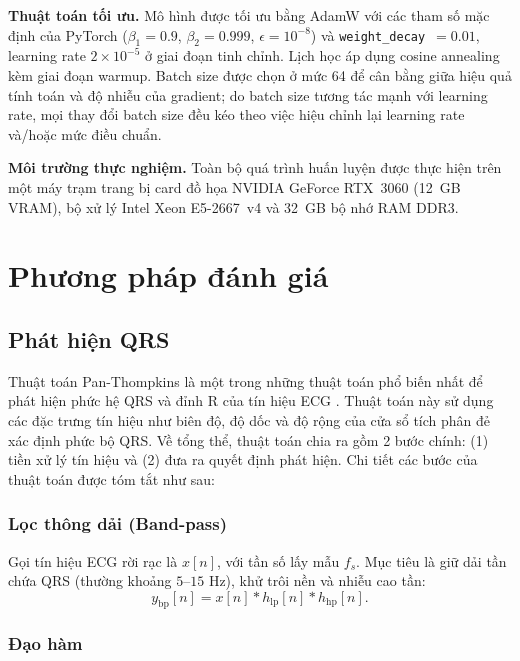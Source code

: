 \documentclass[../DoAn.tex]{subfiles}
\begin{document}
\textbf{Thuật toán tối ưu.}
Mô hình được tối ưu bằng AdamW với các tham số mặc định của PyTorch ($\beta_1=0.9$,
$\beta_2=0.999$, $\epsilon=10^{-8}$) và \texttt{weight\_decay}~$=0.01$, learning rate
$2\times10^{-5}$ ở giai đoạn tinh chỉnh. Lịch học áp dụng cosine annealing kèm giai đoạn
warmup. Batch size được chọn ở mức 64 để cân bằng giữa hiệu quả tính toán và độ nhiễu của
gradient; do batch size tương tác mạnh với learning rate, mọi thay đổi batch size đều kéo theo
việc hiệu chỉnh lại learning rate và/hoặc mức điều chuẩn.

\textbf{Môi trường thực nghiệm.}
Toàn bộ quá trình huấn luyện được thực hiện trên một máy trạm trang bị card đồ họa NVIDIA GeForce RTX~3060 (12~GB VRAM), bộ xử lý Intel Xeon E5-2667~v4 và 32~GB bộ nhớ RAM DDR3.

\section{Phương pháp đánh giá}
\label{sec:evaluation}

\subsection{Phát hiện QRS}

Thuật toán Pan-Thompkins là một trong những thuật toán phổ biến nhất để phát hiện phức hệ QRS và đỉnh R của tín hiệu ECG \cite{panRealTimeQRSDetection1985a}. Thuật toán này sử dụng các đặc trưng tín hiệu như biên độ, độ dốc và độ rộng của cửa sổ tích phân đẻ xác định phức bộ QRS. Về tổng thể, thuật toán chia ra gồm 2 bước chính: (1) tiền xử lý tín hiệu và (2) đưa ra quyết định phát hiện. Chi tiết các bước của thuật toán được tóm tắt như sau:

\subsubsection{Lọc thông dải (Band-pass)}

Gọi tín hiệu ECG rời rạc là $x[n]$, với tần số lấy mẫu $f_s$.
Mục tiêu là giữ dải tần chứa QRS (thường khoảng $5$--$15$ Hz), khử trôi nền và nhiễu cao tần:
\begin{equation}
  y_{\mathrm{bp}}[n] = x[n] * h_{\mathrm{lp}}[n] * h_{\mathrm{hp}}[n].
\end{equation}

\subsubsection{Đạo hàm}
\end{document}
